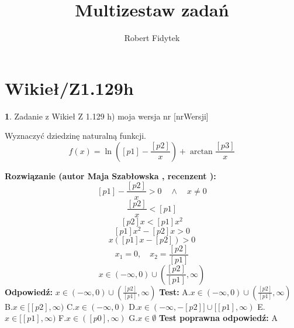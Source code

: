 \documentclass[12pt, a4paper]{article}
\title{Multizestaw zadań}
\author{Robert Fidytek}
\date{}
\theoremstyle{definition} %
\newtheorem{zad}{}
\newcommand{\kategoria}[1]{\section{#1}} %
\newcommand{\zadStart}[1]{\begin{zad}#1\newline} %
\newcommand{\zadStop}{\end{zad}}   %
\newcommand{\rozwStart}[2]{\noindent \textbf{Rozwiązanie (autor #1 , recenzent #2): }\newline} %
\newcommand{\rozwStop}{\newline}                                            %
\newcommand{\odpStart}{\noindent \textbf{Odpowiedź:}\newline}    %
\newcommand{\odpStop}{\newline}                                             %
\newcommand{\testStart}{\noindent \textbf{Test:}\newline} %
\newcommand{\testStop}{\newline} %
\newcommand{\kluczStart}{\noindent \textbf{Test poprawna odpowiedź:}\newline} %
\newcommand{\kluczStop}{\newline} %
\begin{document}
\maketitle


\kategoria{Wikieł/Z1.129h}
\zadStart{Zadanie z Wikieł Z 1.129 h) moja wersja nr [nrWersji]}

Wyznaczyć dziedzinę naturalną funkcji.
$$f(x)=\ln\left([p1]-\frac{[p2]}{x}\right)+\arctan\frac{[p3]}{x}$$

\zadStop

\rozwStart{Maja Szabłowska}{}
$$[p1]-\frac{[p2]}{x}>0 \quad \land \quad x\neq0$$
$$\frac{[p2]}{x}<[p1]$$
$$[p2]x<[p1]x^{2}$$
$$[p1]x^{2}-[p2]x>0$$
$$x([p1]x-[p2])>0$$
$$x_{1}=0,\quad x_{2}=\frac{[p2]}{[p1]}$$
$$x\in\left(-\infty,0\right)\cup\left(\frac{[p2]}{[p1]},\infty\right)$$
\rozwStop
\odpStart
$x\in\left(-\infty,0\right)\cup\left(\frac{[p2]}{[p1]},\infty\right)$
\odpStop
\testStart
A.$x\in\left(-\infty,0\right)\cup\left(\frac{[p2]}{[p1]},\infty\right)$
B.$x\in[[p2],\infty)$
C.$x\in(-\infty, 0)$
D.$x\in(-\infty, -[p2]] \cup [[p1],\infty)$
E.$x\in[[p1],\infty)$
F.$x\in([p0],\infty)$
G.$x\in\emptyset$
\testStop
\kluczStart
A
\kluczStop
\end{document}
